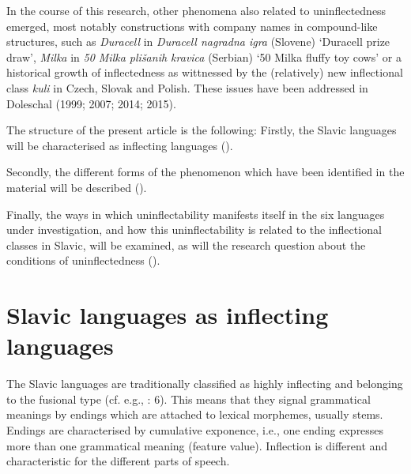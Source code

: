 \documentclass[output=paper]{langscibook}
\begin{document}
In the course of this research, other phenomena also related to uninflectedness emerged, most notably constructions with company names in compound-like structures, such as \textit{Duracell} in \textit{Duracell nagradna igra} (Slovene) ‘Duracell prize draw’, \textit{Milka} in \textit{50 Milka plišanih kravica} (Serbian) ‘50 Milka fluffy toy cows’ or a historical growth of inflectedness as wittnessed by the (relatively) new inflectional class \textit{kuli} in Czech, Slovak and Polish. These issues have been addressed in Doleschal (1999; 2007; 2014; 2015).

The structure of the present article is the following: Firstly, the Slavic languages will be characterised as inflecting languages ().

Secondly, the different forms of the phenomenon which have been identified in the material will be described (). 

Finally, the ways in which uninflectability manifests itself in the six languages under investigation, and how this uninflectability is related to the inflectional classes in Slavic, will be examined, as will the research question about the conditions of uninflectedness ().

\section{Slavic languages as inflecting languages}  %

The Slavic languages are traditionally classified as highly inflecting and belonging to the fusional type (cf. e.g., \citealt{ComrieCorbett1993}: 6). This means that they signal grammatical meanings by endings which are attached to lexical morphemes, usually stems. Endings are characterised by cumulative exponence, i.e., one ending expresses more than one grammatical meaning (feature value). Inflection is different and characteristic for the different parts of speech.
\end{document}
